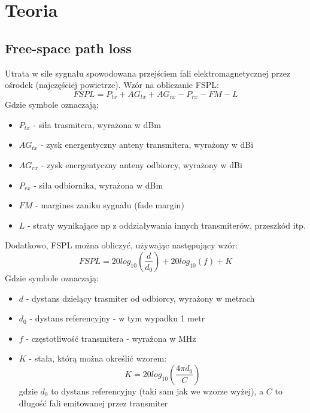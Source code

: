 \documentclass{article}
\date{2016-10-31}
\author{Szymon Nowak}
\begin{document}
  \section{Teoria}
	  \subsection{Free-space path loss}		  		  
		  Utrata w sile sygnału spowodowana przejściem fali elektromagnetycznej przez ośrodek (najczęściej powietrze).
		  Wzór na obliczanie FSPL:
		  \begin{equation}
			  FSPL = P_{tx} + AG_{tx} + AG_{rx} - P_{rx} - FM - L
		  \end{equation}
		  Gdzie symbole oznaczają:
		  \begin{itemize}
		  	\item $P_{tx}$ - siła trasmitera, wyrażona w dBm
		  	\item $AG_{tx}$ - zysk energentyczny anteny transmitera, wyrażony w dBi
		  	\item $AG_{rx}$ - zysk energentyczny anteny odbiorcy, wyrażony w dBi
		  	\item $P_{rx}$ - siła odbiornika, wyrażona w dBm
		  	\item $FM$ - margines zaniku sygnału (fade margin)
		  	\item $L$ - straty wynikające np z oddziaływania innych transmiterów, przeszkód itp.
		  \end{itemize}
		  Dodatkowo, FSPL można obliczyć, używając następujący wzór:
		  \begin{equation}
			  FSPL = 20log_{10}\left(\frac{d}{d_{0}}\right) + 20log_{10}(f) + K
		  \end{equation}
		  Gdzie symbole oznaczają:
		  \begin{itemize}
		  	\item $d$ - dystans dzielący trasmiter od odbiorcy, wyrażony w metrach
		  	\item $d_{0}$ - dystans referencyjny -  w tym wypadku 1 metr
		  	\item $f$ - częstotliwość transmitera - wyrażona w MHz
		  	\item $K$ - stała, którą można określić wzorem:
			  	\begin{equation}
				  	K = 20log_{10}\left(\frac{4\pi d_{0}}{C}\right)
			  	\end{equation}
			  	gdzie $d_{0}$ to dystans referencyjny (taki sam jak we wzorze wyżej), a $C$ to długość fali emitowanej przez transmiter
		  \end{itemize}
	  
\end{document}
